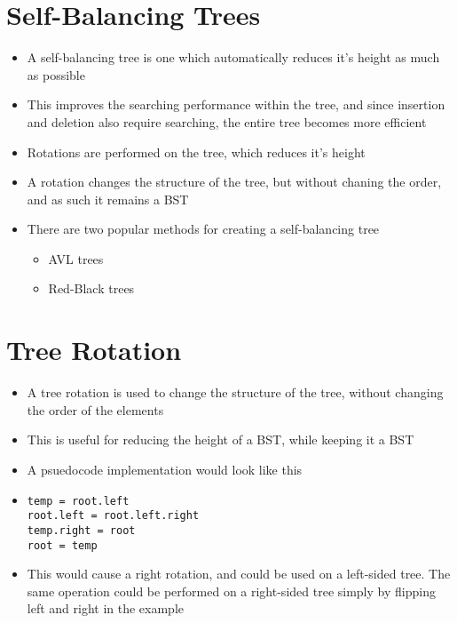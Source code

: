 
\section*{Self-Balancing Trees}

\begin{itemize}
  \item A self-balancing tree is one which automatically reduces it's height as much as possible
  \item This improves the searching performance within the tree, and since insertion and deletion also require searching, the entire tree becomes more efficient
  \item Rotations are performed on the tree, which reduces it's height
  \item A rotation changes the structure of the tree, but without chaning the order, and as such it remains a BST
  \item There are two popular methods for creating a self-balancing tree
  \begin{itemize}
    \item AVL trees
    \item Red-Black trees
  \end{itemize}
\end{itemize}

\section*{Tree Rotation}

\begin{itemize}
  \item A tree rotation is used to change the structure of the tree, without changing the order of the elements
  \item This is useful for reducing the height of a BST, while keeping it a BST
  \item A psuedocode implementation would look like this
  \item \begin{verbatim}
temp = root.left
root.left = root.left.right
temp.right = root
root = temp
  \end{verbatim}
  \item This would cause a right rotation, and could be used on a left-sided tree. The same operation could be performed on a right-sided tree simply by flipping left and right in the example
\end{itemize}


